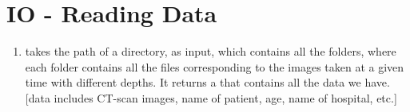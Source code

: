 \section{IO - Reading Data}

\begin{enumerate}
\item {} takes the path of a directory, as input, which contains all the folders, where each folder contains all the files 
corresponding to the images taken at a given time with different depths. 
It returns a  that contains all the data we have. [data includes CT-scan images, name of patient, age, name of hospital, etc.]

\end{enumerate}

